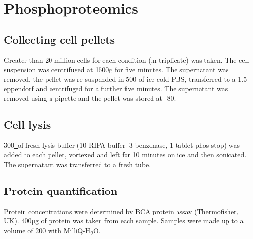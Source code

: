 
\section{Phosphoproteomics}\label{sec:methods-phospho}
%
\subsection{Collecting cell pellets}
Greater than 20 million cells for each condition (in triplicate) was taken.
The cell suspension was centrifuged at 1500g for five minutes.
The supernatant was removed, the pellet was re-suspended in 500\ul{} of ice-cold PBS, transferred to a 1.5\ml{} eppendorf and centrifuged for a further five minutes.
The supernatant was removed using a pipette and the pellet was stored at -80\C{}.

\subsection{Cell lysis}
300\ul\ of fresh lysis buffer (10\ml{} RIPA buffer, 3\ul{} benzonase, 1 tablet phos stop) was added to each pellet, vortexed and left for 10 minutes on ice and then sonicated.
The supernatant was transferred to a fresh tube.

\subsection{Protein quantification}
Protein concentrations were determined by BCA protein assay (Thermofisher, UK). 400\si{\ug} of protein was taken from each sample. Samples were made up to a volume of 200\ul{} with MilliQ-H\textsubscript{2}O.

